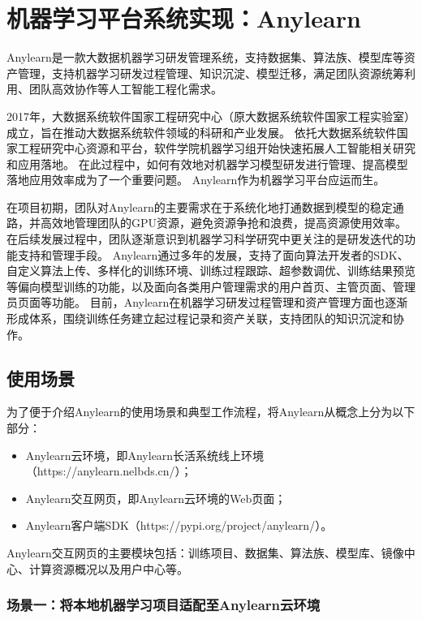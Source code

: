 
\chapter{机器学习平台系统实现：Anylearn}

Anylearn是一款大数据机器学习研发管理系统，支持数据集、算法族、模型库等资产管理，支持机器学习研发过程管理、知识沉淀、模型迁移，满足团队资源统筹利用、团队高效协作等人工智能工程化需求。

2017年，大数据系统软件国家工程研究中心（原大数据系统软件国家工程实验室）成立，旨在推动大数据系统软件领域的科研和产业发展。
依托大数据系统软件国家工程研究中心资源和平台，软件学院机器学习组开始快速拓展人工智能相关研究和应用落地。
在此过程中，如何有效地对机器学习模型研发进行管理、提高模型落地应用效率成为了一个重要问题。
Anylearn作为机器学习平台应运而生。

在项目初期，团队对Anylearn的主要需求在于系统化地打通数据到模型的稳定通路，并高效地管理团队的GPU资源，避免资源争抢和浪费，提高资源使用效率。
在后续发展过程中，团队逐渐意识到机器学习科学研究中更关注的是研发迭代的功能支持和管理手段。
Anylearn通过多年的发展，支持了面向算法开发者的SDK、自定义算法上传、多样化的训练环境、训练过程跟踪、超参数调优、训练结果预览等偏向模型训练的功能，以及面向各类用户管理需求的用户首页、主管页面、管理员页面等功能。
目前，Anylearn在机器学习研发过程管理和资产管理方面也逐渐形成体系，围绕训练任务建立起过程记录和资产关联，支持团队的知识沉淀和协作。

\section{使用场景}

为了便于介绍Anylearn的使用场景和典型工作流程，将Anylearn从概念上分为以下部分：
\begin{itemize}
  \item Anylearn云环境，即Anylearn长活系统线上环境（https://anylearn.nelbds.cn/）；
  \item Anylearn交互网页，即Anylearn云环境的Web页面；
  \item Anylearn客户端SDK（https://pypi.org/project/anylearn/）。
\end{itemize}

Anylearn交互网页的主要模块包括：训练项目、数据集、算法族、模型库、镜像中心、计算资源概况以及用户中心等。

\subsection{场景一：将本地机器学习项目适配至Anylearn云环境}

